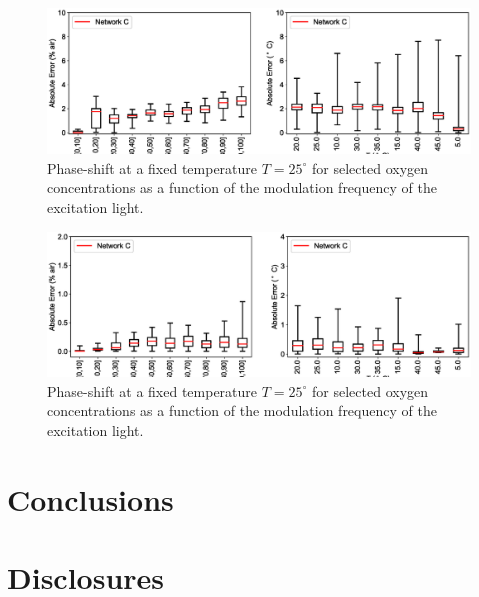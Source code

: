 \documentclass[9pt,twocolumn,twoside,pdftex]{optica}
\begin{document}
\begin{figure}[htbp]
\centering
\includegraphics[width=9 cm]{results_theta90.eps}
\caption{Phase-shift at a fixed temperature $T=25 ^{\circ}$ for selected oxygen concentrations as a function of the modulation frequency of the excitation light.}
\label{fig:result_90}
\end{figure}


\begin{figure}[htbp]
\centering
\includegraphics[width=9 cm]{result_theta_theta0.eps}
\caption{Phase-shift at a fixed temperature $T=25 ^{\circ}$ for selected oxygen concentrations as a function of the modulation frequency of the excitation light.}
\label{fig:result_theta0}
\end{figure}







\section{Conclusions}






\section*{Disclosures}
\end{document}
